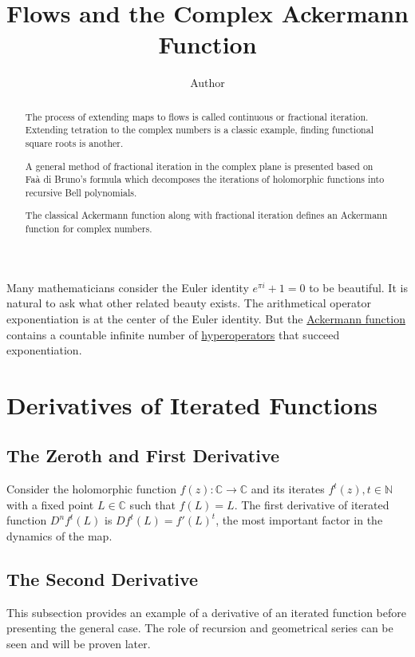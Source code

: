 \documentclass{article}
\theoremstyle{definition}
\begin{document}
\title{Flows and the Complex Ackermann Function}
\author{Author}

\maketitle

\begin{abstract}
The process of extending maps to flows is called continuous or fractional iteration. Extending tetration to the complex numbers is a classic example, finding functional square roots is another.

A general method of fractional iteration in the complex plane is presented based on Faà di Bruno's formula which decomposes the iterations of holomorphic functions into recursive Bell polynomials.

The classical Ackermann function along with fractional iteration defines an Ackermann function for complex numbers. 
\end{abstract}

\noindent

Many mathematicians consider the Euler identity $e^{\pi i}+1=0$ to be beautiful. It is natural to ask what other related beauty exists. The arithmetical operator exponentiation is at the center of the Euler identity. But the \href{https://en.wikipedia.org/wiki/Ackermann_function}{Ackermann function} contains a countable infinite number of \href{https://en.wikipedia.org/wiki/Hyperoperation}{hyperoperators} that succeed exponentiation. 

\section{Derivatives of Iterated Functions}

\subsection{The Zeroth and First Derivative}

Consider the holomorphic function $f(z): \mathbb{C} \rightarrow \mathbb{C}$ and its iterates $f^t(z), t \in \mathbb{N}$ with a fixed point $L\in\mathbb{C}$ such that $f(L)=L$. The first derivative of iterated function $D^nf^t(L)$ is $Df^t(L)=f'(L)^t$, the most important factor in the dynamics of the map.

\subsection{The Second Derivative}
This subsection provides an example of a derivative of an iterated function before presenting the general case. The role of recursion and geometrical series can be seen and will be proven later.
\end{document}
